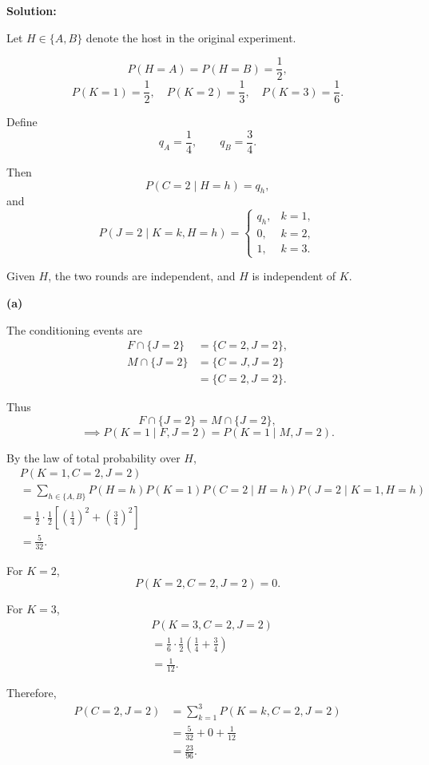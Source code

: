 \documentclass[11pt,a4paper]{article}
\newcommand{\Prob}{P}
\begin{document}
\noindent\textbf{Solution:}

Let $H\in\{A,B\}$ denote the host in the original experiment.

\[
\Prob(H=A)=\Prob(H=B)=\frac12,
\]
\[
\Prob(K=1)=\frac12,\quad
\Prob(K=2)=\frac13,\quad
\Prob(K=3)=\frac16.
\]

Define
\[
q_A=\frac14,\qquad q_B=\frac34.
\]

Then
\[
\Prob(C=2\mid H=h)=q_h,
\]
and
\[
\Prob(J=2\mid K=k,H=h)=
\begin{cases}
q_h, & k=1,\\
0, & k=2,\\
1, & k=3.
\end{cases}
\]

Given $H$, the two rounds are independent, and $H$ is independent
of $K$.

\medskip
\noindent\textbf{(a)}

The conditioning events are
\[
\begin{aligned}
F\cap\{J=2\}
&=\{C=2,J=2\},\\
M\cap\{J=2\}
&=\{C=J,J=2\}\\
&=\{C=2,J=2\}.
\end{aligned}
\]

Thus
\[
F\cap\{J=2\}=M\cap\{J=2\},
\]
\[
\implies
\Prob(K=1\mid F,J=2)
=
\Prob(K=1\mid M,J=2).
\]

By the law of total probability over $H$,
\[
\begin{aligned}
&\Prob(K=1,C=2,J=2)\\
&=\sum_{h\in\{A,B\}}
\Prob(H=h)\Prob(K=1)
\Prob(C=2\mid H=h)
\Prob(J=2\mid K=1,H=h)\\
&=\frac12\cdot\frac12
\left[
\left(\frac14\right)^2+
\left(\frac34\right)^2
\right]\\
&=\frac5{32}.
\end{aligned}
\]

For $K=2$,
\[
\Prob(K=2,C=2,J=2)=0.
\]

For $K=3$,
\[
\begin{aligned}
&\Prob(K=3,C=2,J=2)\\
&=\frac16\cdot\frac12
\left(\frac14+\frac34\right)\\
&=\frac1{12}.
\end{aligned}
\]

Therefore,
\[
\begin{aligned}
\Prob(C=2,J=2)
&=\sum_{k=1}^{3}\Prob(K=k,C=2,J=2)\\
&=\frac5{32}+0+\frac1{12}\\
&=\frac{23}{96}.
\end{aligned}
\]
\end{document}
